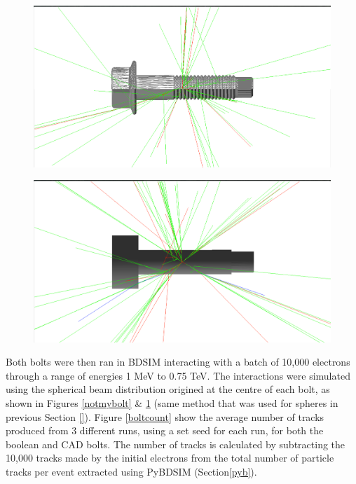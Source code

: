 \documentclass[12pt,a4paper]{article}
\begin{document}
\begin{figure}[h!]
\centering
\begin{minipage}{.5\textwidth}
  \centering
  \includegraphics[height=.5\linewidth]{Images//CAD_Screw//Screw_hnh_10MeVe.png}
  \label{notmybolt}
\end{minipage}%
\begin{minipage}{.5\textwidth}
  \centering
  \includegraphics[height=.5\linewidth]{Images//CAD_Screw//bensboltinbdsim.png}
  \label{mybolt}
\end{minipage}%
\end{figure}

\noindent Both bolts were then ran in BDSIM interacting with a batch of 10,000 electrons through a range of energies 1 MeV to 0.75 TeV. The interactions were simulated using the spherical beam distribution origined at the centre of each bolt, as shown in Figures \ref{notmybolt} \& \ref{mybolt} (same method that was used for spheres in previous Section \ref{}). Figure \ref{boltcount} show the average number of tracks produced from 3 different runs, using a set seed for each run, for both the boolean and CAD bolts. The number of tracks is calculated by subtracting the 10,000 tracks made by the initial electrons from the total number of particle tracks per event extracted using PyBDSIM (Section\ref{pyb}).
\end{document}

